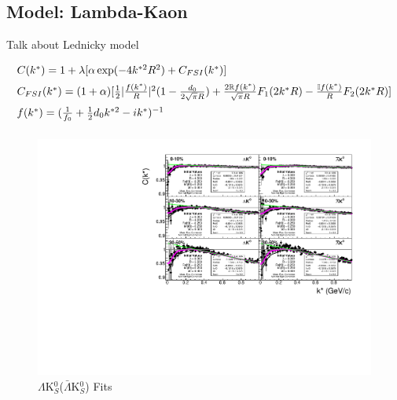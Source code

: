\documentclass[../AnalysisNoteJBuxton.tex]{subfiles}
\begin{document}
\subsection{Model: Lambda-Kaon}
\label{ModelLambdaKaon}

Talk about Lednicky model

\begin{equation}
\begin{array}{l}
\vspace{2mm}  %
  C(k^{*}) = 1+\lambda[\alpha\exp(-4k^{*2}R^{2})+C_{FSI}(k^{*})] \\
\vspace{2mm}  %
  C_{FSI}(k^{*}) = (1+\alpha)[\frac{1}{2}|\frac{f(k^{*})}{R}|^2(1-\frac{d_{0}}{2\sqrt{\pi}R})+\frac{2\mathbb{R}f(k^{*})}{\sqrt{\pi}R}F_{1}(2k^{*}R)-\frac{\mathbb{I}f(k^{*})}{R}F_{2}(2k^{*}R)] \\
\vspace{2mm}  %
  f(k^{*}) = (\frac{1}{f_{0}}+\frac{1}{2}d_{0}k^{*2}-ik^{*})^{-1}
\end{array}  
\label{eqn:LednickyEqn}
\end{equation}

\begin{figure}[h]
  \centering
  \includegraphics[width=\textwidth]{5_Fitting/Figures/canKStarCfwFitsLamK0wConj_MomResCrctn_NonFlatBgdCrctn.pdf}
  \caption[$\Lambda$K$^{0}_{S}$($\bar{\Lambda}$K$^{0}_{S}$) Fits]{$\Lambda$K$^{0}_{S}$($\bar{\Lambda}$K$^{0}_{S}$) Fits}
  \label{fig:LamK0wConjFits}
\end{figure}
\end{document}
